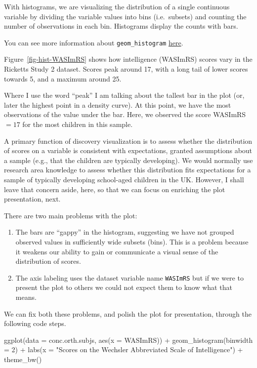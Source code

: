 \documentclass[
  letterpaper,
  DIV=11,
  numbers=noendperiod]{scrreprt}
\newenvironment{Shaded}{\begin{snugshade}}{\end{snugshade}}
\newcommand{\AttributeTok}[1]{\textcolor[rgb]{0.40,0.45,0.13}{#1}}
\newcommand{\DecValTok}[1]{\textcolor[rgb]{0.68,0.00,0.00}{#1}}
\newcommand{\FunctionTok}[1]{\textcolor[rgb]{0.28,0.35,0.67}{#1}}
\newcommand{\NormalTok}[1]{\textcolor[rgb]{0.00,0.23,0.31}{#1}}
\newcommand{\SpecialCharTok}[1]{\textcolor[rgb]{0.37,0.37,0.37}{#1}}
\newcommand{\StringTok}[1]{\textcolor[rgb]{0.13,0.47,0.30}{#1}}
\providecommand{\tightlist}{%
  \setlength{\itemsep}{0pt}\setlength{\parskip}{0pt}}\usepackage{longtable,booktabs,array}
\begin{document}
With histograms, we are visualizing the distribution of a single
continuous variable by dividing the variable values into bins
(i.e.~subsets) and counting the number of observations in each bin.
Histograms display the counts with bars.

You can see more information about \texttt{geom\_histogram}
\href{https://ggplot2.tidyverse.org/reference/geom_histogram.html}{here}.

Figure~\ref{fig-hist-WASImRS} shows how intelligence (WASImRS) scores
vary in the Ricketts Study 2 dataset. Scores peak around 17, with a long
tail of lower scores towards 5, and a maximum around 25.

Where I use the word ``peak'' I am talking about the tallest bar in the
plot (or, later the highest point in a density curve). At this point, we
have the most observations of the value under the bar. Here, we observed
the score WASImRS \(= 17\) for the most children in this sample.

A primary function of discovery visualization is to assess whether the
distribution of scores on a variable is consistent with expectations,
granted assumptions about a sample (e.g., that the children are
typically developing). We would normally use research area knowledge to
assess whether this distribution fits expectations for a sample of
typically developing school-aged children in the UK. However, I shall
leave that concern aside, here, so that we can focus on enriching the
plot presentation, next.

There are two main problems with the plot:

\begin{enumerate}
\def\labelenumi{\arabic{enumi}.}
\tightlist
\item
  The bars are ``gappy'' in the histogram, suggesting we have not
  grouped observed values in sufficiently wide subsets (bins). This is a
  problem because it weakens our ability to gain or communicate a visual
  sense of the distribution of scores.
\item
  The axis labeling uses the dataset variable name \texttt{WASImRS} but
  if we were to present the plot to others we could not expect them to
  know what that means.
\end{enumerate}

We can fix both these problems, and polish the plot for presentation,
through the following code steps.

\begin{Shaded}
\begin{Highlighting}[numbers=left,,]
\FunctionTok{ggplot}\NormalTok{(}\AttributeTok{data =}\NormalTok{ conc.orth.subjs, }\FunctionTok{aes}\NormalTok{(}\AttributeTok{x =}\NormalTok{ WASImRS)) }\SpecialCharTok{+}
  \FunctionTok{geom\_histogram}\NormalTok{(}\AttributeTok{binwidth =} \DecValTok{2}\NormalTok{) }\SpecialCharTok{+}
  \FunctionTok{labs}\NormalTok{(}\AttributeTok{x =} \StringTok{"Scores on the Wechsler Abbreviated Scale of Intelligence"}\NormalTok{) }\SpecialCharTok{+}
  \FunctionTok{theme\_bw}\NormalTok{()}
\end{Highlighting}
\end{Shaded}
\end{document}
